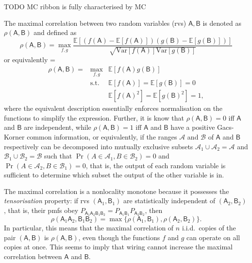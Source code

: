 \documentclass[10pt, a4paper]{article}
\numberwithin{equation}{section} %
\theoremstyle{definition}
\theoremstyle{plain}
\newenvironment{Array}[1] %
{\def\arraystretch{1.75}\everymath={\displaystyle}\begin{equation}\begin{array}{#1}}
{\end{array}\end{equation}}
\newcommand{\?}{\mathrel{?}} %
\newcommand{\E}{\mathbb{E}} %
\newcommand{\Var}{\mathrm{Var}} %
\newcommand{\sA}{\mathcal{A}}
\newcommand{\sB}{\mathcal{B}}
\newcommand{\crv}[1]{\mathsf{#1}}
\begin{document}
    TODO MC ribbon is fully characterised by MC

    The maximal correlation between two random variables (rvs) \(\crv{A},\crv{B}\) is denoted as \(\rho(\crv{A},\crv{B})\) and defined as~\cite{NLMonotones}
    \begin{equation}
      \rho(\crv{A},\crv{B}) = \max_{f,g} \frac{\E[(f(\crv{A})-\E[f(\crv{A})])(g(\crv{B})-\E[g(\crv{B})])]}{\sqrt{\Var[f(\crv{A})]\Var[g(\crv{B})]}}
    \end{equation}
    or equivalently
    \begin{Array}{rcl}
      \rho(\crv{A},\crv{B}) = & \max_{f,g}  & \E[f(\crv{A})g(\crv{B})] \\
                  & \text{s.t.} & \E[f(\crv{A})] = \E[g(\crv{B})] = 0 \\
                  &             & \E[f(\crv{A})^2] = \E[g(\crv{B})^2] = 1,
    \end{Array}
    where the equivalent description essentially enforces normalisation on the functions to simplify the expression. Further, it is know that \(\rho(\crv{A},\crv{B}) = 0\) iff \(\crv{A}\) and \(\crv{B}\) are independent, while \(\rho(\crv{A},\crv{B}) = 1\) iff \(\crv{A}\) and \(\crv{B}\) have a positive Gacs-Korner common information, or equivalently, if the ranges \(\sA\) and \(\sB\) of \(\crv{A}\) and \(\crv{B}\) respectively can be decomposed into mutually exclusive subsets \(\sA_1 \cup \sA_2 = \sA\) and \(\sB_1 \cup \sB_2 = \sB\) such that \(\Pr(A \in \sA_1, B \in \sB_2) = 0\) and \(\Pr(A \in \sA_2, B \in \sB_1) = 0\), that is, the output of each random variable is sufficient to determine which subset the output of the other variable is in.

    The maximal correlation is a nonlocality monotone because it possesses the \emph{tensorisation} property: if rvs \((\crv{A}_1, \crv{B}_1)\) are statistically independent of \((\crv{A}_2,\crv{B}_2)\), that is, their pmfs obey \(P_{\crv{A}_1\crv{A}_2\crv{B}_1\crv{B}_2} = P_{\crv{A}_1\crv{B}_1}P_{\crv{A}_2\crv{B}_2}\), then
    \begin{equation}
      \rho(\crv{A}_1\crv{A}_2,\crv{B}_1\crv{B}_2) = \max\{ \rho(\crv{A}_1,\crv{B}_1), \rho(\crv{A}_2,\crv{B}_2) \}.
    \end{equation}
    In particular, this means that the maximal correlation of \(n\) i.i.d.\ copies of the pair \((\crv{A},\crv{B})\) is \(\rho(\crv{A},\crv{B})\), even though the functions \(f\) and \(g\) can operate on all copies at once. This seems to imply that wiring cannot increase the maximal correlation between \(\crv{A}\) and \(\crv{B}\).
\end{document}
